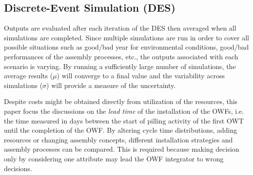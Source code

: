 \subsection{Discrete-Event Simulation (DES)}

Outputs are evaluated after each iteration of the DES then averaged when all simulations are completed. Since multiple simulations are run in order to cover all possible situations such as good/bad year for environmental conditions, good/bad performances of the assembly processes, etc., the outputs associated with each scenario is varying. By running a sufficiently large number of simulations, the average results ($\mu$) will converge to a final value and the variability across simulations ($\sigma$) will provide a measure of the uncertainty.

Despite costs might be obtained directly from utilization of the resources, this paper focus the discussions on the \textit{lead time} of the installation of the OWFs, i.e. the time measured in days between the start of pilling activity of the first OWT until the completion of the OWF. By altering cycle time distributions, adding resources or changing assembly concepts, different installation strategies and assembly processes can be compared. This is required because making decision only by considering one attribute may lead the OWF integrator to wrong decisions.

